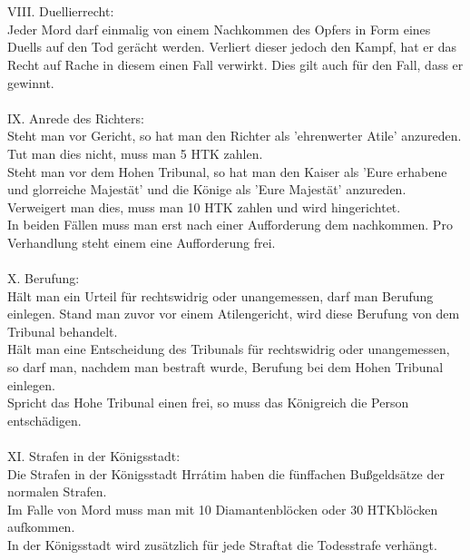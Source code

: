 \documentclass{article}
\begin{document}
\\\\
VIII. Duellierrecht:\\Jeder Mord darf einmalig von einem Nachkommen des Opfers in Form eines Duells auf den Tod gerächt werden. Verliert dieser jedoch den Kampf, hat er das Recht auf Rache in diesem einen Fall verwirkt. Dies gilt auch für den Fall, dass er gewinnt.
\\\\
IX. Anrede des Richters:\\Steht man vor Gericht, so hat man den Richter als 'ehrenwerter Atile' anzureden. Tut man dies nicht, muss man 5 HTK zahlen.\\Steht man vor dem Hohen Tribunal, so hat man den Kaiser als 'Eure erhabene und glorreiche Majestät' und die Könige als 'Eure Majestät' anzureden. Verweigert man dies, muss man 10 HTK zahlen und wird hingerichtet.\\In beiden Fällen muss man erst nach einer Aufforderung dem nachkommen. Pro Verhandlung steht einem eine Aufforderung frei.
\\\\
X. Berufung:\\Hält man ein Urteil für rechtswidrig oder unangemessen, darf man Berufung einlegen. Stand man zuvor vor einem Atilengericht, wird diese Berufung von dem Tribunal behandelt.\\Hält man eine Entscheidung des Tribunals für rechtswidrig oder unangemessen, so darf man, nachdem man bestraft wurde, Berufung bei dem Hohen Tribunal einlegen.\\Spricht das Hohe Tribunal einen frei, so muss das Königreich die Person entschädigen.
\\\\
XI. Strafen in der Königsstadt:\\Die Strafen in der Königsstadt Hrrátim haben die fünffachen Bußgeldsätze der normalen Strafen.\\Im Falle von Mord muss man mit 10 Diamantenblöcken oder 30 HTKblöcken aufkommen.\\In der Königsstadt wird zusätzlich für jede Straftat die Todesstrafe verhängt.
\\\\
\end{document}
